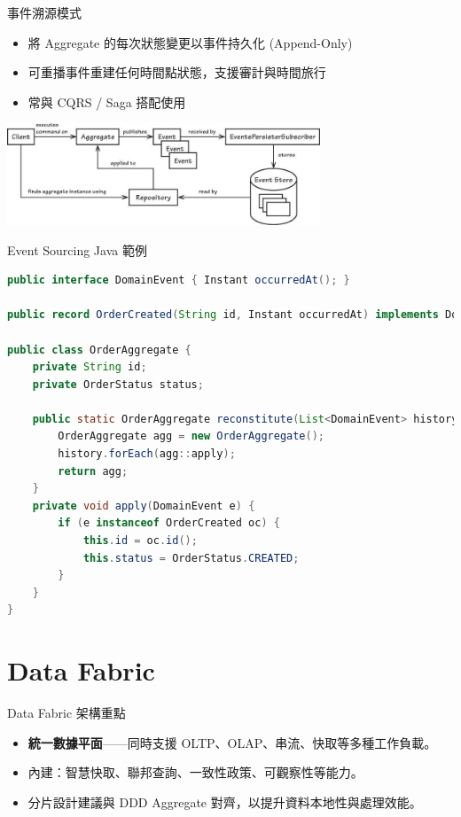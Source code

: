 \documentclass[UTF8]{beamer}
\begin{document}
\begin{frame}{事件溯源模式}
    \begin{itemize}
        \item 將 Aggregate 的每次狀態變更以事件持久化 (Append-Only)
        \item 可重播事件重建任何時間點狀態，支援審計與時間旅行
        \item 常與 CQRS / Saga 搭配使用
    \end{itemize}
    \begin{center}
        \includegraphics[width=0.7\textwidth]{img/event-sourcing-pipeline.png}
    \end{center}
\end{frame}

\begin{frame}[fragile]{Event Sourcing Java 範例}
    \begin{lstlisting}[language=Java]
public interface DomainEvent { Instant occurredAt(); }

public record OrderCreated(String id, Instant occurredAt) implements DomainEvent {}

public class OrderAggregate {
    private String id;
    private OrderStatus status;

    public static OrderAggregate reconstitute(List<DomainEvent> history) {
        OrderAggregate agg = new OrderAggregate();
        history.forEach(agg::apply);
        return agg;
    }
    private void apply(DomainEvent e) {
        if (e instanceof OrderCreated oc) {
            this.id = oc.id();
            this.status = OrderStatus.CREATED;
        }
    }
}
\end{lstlisting}
\end{frame}

\section{Data Fabric}

\begin{frame}{Data Fabric 架構重點}
    \begin{itemize}
        \item \textbf{統一數據平面}——同時支援 OLTP、OLAP、串流、快取等多種工作負載。
        \item 內建：智慧快取、聯邦查詢、一致性政策、可觀察性等能力。
        \item 分片設計建議與 DDD Aggregate 對齊，以提升資料本地性與處理效能。
    \end{itemize}
\end{frame}
\end{document}
